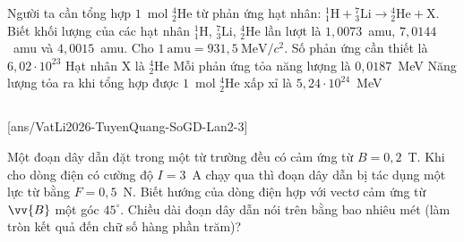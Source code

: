 	\begin{ex}%
		Người ta cần tổng hợp $1$~mol ${}^4_2\text{He}$ từ phản ứng hạt nhân: ${}^1_1\text{H}+{}^7_3\text{Li}\to{}^4_2\text{He}+\text{X}$. Biết khối lượng của các hạt nhân ${}^1_1\text{H}$, ${}^7_3\text{Li}$, ${}^4_2\text{He}$ lần lượt là $1{,}0073$~amu, $7{,}0144$~amu và $4{,}0015$~amu. Cho $1~\text{amu}=931{,}5~\text{MeV}/c^2$.
		\choiceTFt
		{Số phản ứng cần thiết là $6{,}02\cdot 10^{23}$}
		{\True Hạt nhân X là ${}^4_2\text{He}$}
		{Mỗi phản ứng tỏa năng lượng là $0{,}0187$~MeV}
		{\True Năng lượng tỏa ra khi tổng hợp được $1$~mol ${}^4_2\text{He}$ xấp xỉ là $5{,}24\cdot 10^{24}$~MeV}
	\end{ex}

	\subsection*{}
	\setcounter{ex}{0}
	[ans/VatLi2026-TuyenQuang-SoGD-Lan2-3]

	\begin{ex}%
		Một đoạn dây dẫn đặt trong một từ trường đều có cảm ứng từ $B=0{,}2$~T. Khi cho dòng điện có cường độ $I=3$~A chạy qua thì đoạn dây dẫn bị tác dụng một lực từ bằng $F=0{,}5$~N. Biết hướng của dòng điện hợp với vectơ cảm ứng từ $\vv{B}$ một góc $45^\circ$. Chiều dài đoạn dây dẫn nói trên bằng bao nhiêu mét (làm tròn kết quả đến chữ số hàng phần trăm)?
		\par
	\end{ex}


